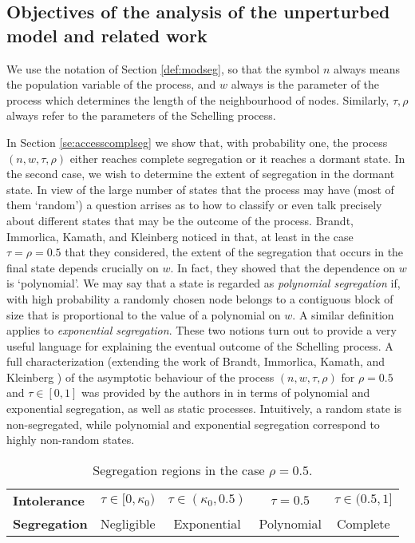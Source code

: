 \documentclass[11pt]{article}
\theoremstyle{plain}
\numberwithin{equation}{subsection}
\begin{document}
\subsection{Objectives of the analysis of the unperturbed model and related work}
\label{sub:knownressch}
\label{se:1Dmorphojob}
We use the notation of Section \ref{def:modseg}, so that 
the symbol $n$ always means the population
variable of the process, and $w$ always is the parameter of the process which
determines the length of the neighbourhood of nodes. Similarly, $\tau, \rho$
always refer to the parameters of the Schelling process.

In Section \ref{se:accesscomplseg} we show that,
with probability one, the process 
$(n, w, \tau, \rho)$ either reaches complete segregation or
it reaches a dormant state.
In the second case, we wish to 
determine the extent of segregation in the dormant state.
In view of the large number of states that the process may have
(most of them `random') a question arrises as to how to classify or even
talk precisely about different states that may be the outcome of the process.
Brandt, Immorlica, Kamath, and Kleinberg noticed in \cite{brandt:an} that, 
at least in the case $\tau=\rho=0.5$ that they considered, 
the extent of the segregation that occurs in the final state
depends crucially on $w$. In fact, they showed that
the dependence on $w$ is `polynomial'.
We may say that
a state is regarded as {\em polynomial segregation} if, with high probability
a randomly chosen node belongs to a contiguous block of size that is proportional to 
the value of a polynomial on $w$. A similar definition applies to 
{\em exponential segregation}. These two notions turn out to provide 
a very useful language for explaining the eventual outcome of the Schelling process.
A full characterization (extending the work of Brandt, Immorlica, Kamath, and Kleinberg 
\cite{brandt:an}) of the asymptotic behaviour of the process $(n,w, \tau, \rho)$
for $\rho=0.5$ and $\tau\in[0,1]$ was provided by the authors in \cite{BELschel13}
in terms of polynomial and exponential segregation, as well as static processes.
Intuitively, a random state is non-segregated, while polynomial 
and exponential segregation correspond to highly non-random states.
\begin{table}
\colorbox{black!10}{
\begin{tabular}{l|cccc}
\toprule
{\small\bf Intolerance}& {\small $\tau\in [0,\kappa_0)$} & {\small  $\tau\in (\kappa_0, 0.5)$} & 
{\small  $\tau=0.5$}&{\small  $\tau\in (0.5, 1]$} \\[1ex]
{\small\bf Segregation}&{\small Negligible}  &{\small Exponential} & {\small Polynomial}& {\small Complete} \\
\bottomrule
\end{tabular} }
\centering
\caption{Segregation regions in the case $\rho=0.5$.}
\label{ta:vsclassifpoex}
\end{table}
\end{document}
